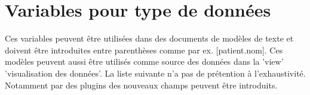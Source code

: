 
\section{Variables pour type de données}
\label{Platzhalter}
Ces variables peuvent être utilisées dans des documents de modèles de texte et doivent être introduites entre parenthèses comme par ex.  [patient.nom].
Ces modèles peuvent aussi être utilisés comme source des données dans la 'view' 'visualisation des données'.
La liste suivante n'a pas de prétention à l'exhaustivité. Notamment par des plugins des nouveaux champs peuvent être introduits.

